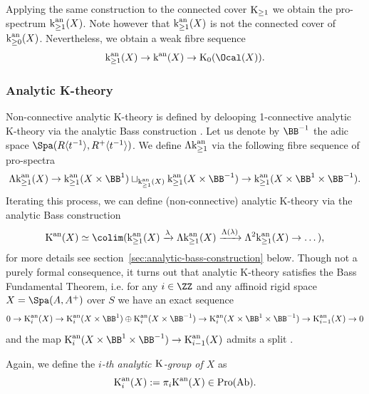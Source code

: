 \documentclass[colorinlistoftodos,article,11pt,reqno]{article}
\newcommand{\Pro}{\textup{Pro}}
\newcommand{\K}{\textup{K}}
\newcommand{\Kan}{\K^\textup{an}}
\newcommand{\kan}{\textup{k}^\textup{an}}
\newcommand{\Brig}{\BB^{1}}
\begin{document}
Applying the same construction to the connected cover $\K_{\geq 1}$ we obtain the pro-spectrum $\kan_{\geq 1}(X)$. Note however that $\kan_{\geq 1}(X)$ is not the connected cover of $\kan_{\geq 0}(X)$. Nevertheless, we obtain a weak fibre sequence
\begin{align}
\label{fibre-sequence-1-connective-cover}
    \kan_{\geq 1}(X)\rightarrow \kan(X)\rightarrow \K_{0}(\Ocal(X)).
\end{align} 


\subsubsection*{Analytic K-theory}
Non-connective analytic K-theory is defined by delooping 1-connective analytic K-theory via the analytic Bass construction \cite[\S 6.3]{kst-i}.
Let us denote by $\BB^{-1}$ the adic space $\Spa(R\langle t^{-1}\rangle,R^+\langle t^{-1}\rangle)$. We define $\Lambda\kan_{\geq 1}$ via the following fibre sequence of pro-spectra  
$$
    \Lambda \kan_{\geq 1}(X)\rightarrow \kan_{\geq 1}(X \times \Brig)\sqcup_{\kan_{\geq 1}(X)} \kan_{\geq 1}(X \times \BB^{-1})\rightarrow \kan_{\geq 1}(X \times \Brig \times \BB^{-1}).
$$
Iterating this process, we can define (non-connective) analytic K-theory via the analytic Bass construction 
$$
    \Kan(X)\simeq \colim (\kan_{\geq 1}(X)\xrightarrow{\lambda} \Lambda \kan_{\geq 1}(X)\xrightarrow{\Lambda(\lambda)}  \Lambda^2 \kan_{\geq 1}(X)\rightarrow\dots),
$$
for more details see section~\ref{sec:analytic-bass-construction} below. 
Though not a purely formal consequence, it turns out that analytic K-theory satisfies the Bass Fundamental Theorem, i.e. for any $i\in\ZZ$ and any affinoid rigid space $X = \Spa(A,A^+)$ over $S$ we have an exact sequence
$$
    0\rightarrow \Kan_{i}(X)\rightarrow \Kan_{i}(X \times \Brig)\oplus \Kan_{i}(X \times \BB^{-1})\rightarrow \Kan_{i}(X \times \Brig \times \BB^{-1})\rightarrow \Kan_{i-1}(X)\rightarrow 0
$$
and the map $\Kan_{i}(X \times \Brig \times \BB^{-1})\rightarrow \Kan_{i-1}(X)$ admits a split \cite[Cor.~2.6]{kst-ii}. 



Again, we define the \textit{$i$-th analytic $\K$-group of $X$} as 
\[ \Kan_{i}(X) := \pi_{i}\Kan(X)\in \Pro(\textup{Ab}). \]
\end{document}

